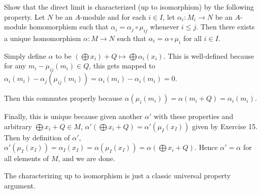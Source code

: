 \begin{questions}
\begin{solution}
	\end{solution}

	\question Show that the direct limit is characterized (up to isomorphism) by the following property. Let $N$ be an $A$-module and for each $i\in I $, let $\alpha _i: M_i \to N$ be an $A$-module homomorphism such that $\alpha _i = \alpha _j \circ \mu_{ij}$ whenever $i\le j$. Then there exists a unique homomorphism $\alpha :M\to N$ such that $\alpha _i = \alpha \circ \mu _i$ for all $i\in I$.
	\begin{solution}
		Simply define $\alpha$ to be $\left(\bigoplus x_i\right) + Q \mapsto \bigoplus \alpha_i(x_i)$.
		This is well-defined because for any $m_i - \mu_{ij}(m_i) \in Q $, this gets mapped to $\alpha _i(m_i) - \alpha_j(\mu _{ij}(m_i)) = \alpha _i(m_i) - \alpha _i(m_i) = 0$.

		Then this commutes properly because $\alpha (\mu _i(m_i)) = \alpha (m_i+Q) = \alpha _i(m_i)$.

		Finally, this is unique because given another $\alpha'$ with these properties and arbitrary $\bigoplus x_i +Q \in M $, $\alpha' (\bigoplus x_i+Q) = \alpha'(\mu _I(x_I))$ given by Exercise 15.
		Then by definition of $\alpha ' $, $\alpha '(\mu _I(x_I)) = \alpha_I(x_I) = \alpha(\mu _I(x_I)) = \alpha (\bigoplus x_i + Q)$.
		Hence $\alpha '= \alpha$ for all elements of $M $, and we are done.

		The characterizing up to isomorphism is just a classic universal property argument.
	\end{solution}


\end{questions}
